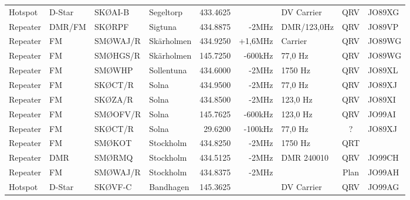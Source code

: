 \begin{landscape}
\begin{longtable}{llllrrlcl}
	Hotspot           & D-Star       & SKØAI-B       & Segeltorp    & 433.4625          &                & DV Carrier      & QRV             & JO89XG           \\
	Repeater          & DMR/FM       & SKØRPF        & Sigtuna      & 434.8875          & -2MHz          & DMR/123,0Hz     & QRV             & JO89VP           \\
	Repeater          & FM           & SMØWAJ/R      & Skärholmen   & 434.9250          & +1,6MHz        & Carrier         & QRV             & JO89WG           \\
	Repeater          & FM           & SMØHGS/R      & Skärholmen   & 145.7250          & -600kHz        & 77,0 Hz         & QRV             & JO89WG           \\
	Repeater          & FM           & SMØWHP        & Sollentuna   & 434.6000          & -2MHz          & 1750 Hz         & QRV             & JO89XL           \\
	Repeater          & FM           & SKØCT/R       & Solna        & 434.9500          & -2MHz          & 77,0 Hz         & QRV             & JO89XJ           \\
	Repeater          & FM           & SKØZA/R       & Solna        & 434.8500          & -2MHz          & 123,0 Hz        & QRV             & JO89XI           \\
	Repeater          & FM           & SMØOFV/R      & Solna        & 145.7625          & -600kHz        & 123,0 Hz        & QRV             & JO99AI           \\
	Repeater          & FM           & SKØCT/R       & Solna        & 29.6200           & -100kHz        & 77,0 Hz         & ?               & JO89XJ           \\
	Repeater          & FM           & SMØKOT        & Stockholm    & 434.8250          & -2MHz          & 1750 Hz         & QRT             &                  \\
	Repeater          & DMR          & SMØRMQ        & Stockholm    & 434.5125          & -2MHz          & DMR 240010      & QRV             & JO99CH           \\
	Repeater          & FM           & SMØWAJ/R      & Stockholm    & 434.8375          & -2MHz          &                 & Plan            & JO99AH           \\
	Hotspot           & D-Star       & SKØVF-C       & Bandhagen    & 145.3625          &                & DV Carrier      & QRV             & JO99AG           \\

\end{longtable}
\end{landscape}
